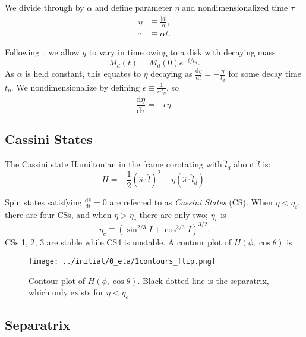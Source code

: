\documentclass[
        fleqn,
        usenatbib,
    ]{mnras}
\newcommand*{\rd}[2]{\frac{\mathrm{d}#1}{\mathrm{d}#2}}
\newcommand*{\abs}[1]{\left|#1\right|}
\newcommand*{\p}[1]{\left(#1\right)}
\begin{document}
We divide through by $\alpha$ and define parameter $\eta$ and nondimensionalized
time $\tau$
\begin{align}
    \eta &\equiv \frac{\abs{g}}{\alpha}\label{eq:eta},\\
    \tau &\equiv \alpha t.
\end{align}

Following~\cite{millholland_disk}, we allow $g$ to vary in time owing to a
disk with decaying mass
\begin{equation}
    M_d(t) = M_d(0)e^{-t/t_d}.
\end{equation}
As $\alpha$ is held constant, this equates to $\eta$ decaying as $\rd{\eta}{t} =
-\frac{\eta}{t_d}$ for some decay time $t_\eta$. We nondimensionalize by
defining $\epsilon \equiv \frac{1}{\alpha t_\eta}$, so
\begin{equation}
    \rd{\eta}{\tau} = -\epsilon \eta.
\end{equation}

\subsection{Cassini States}\label{ss:cs}

The Cassini state Hamiltonian in the frame corotating with $\hat{l}_d$ about
$\hat{l}$ is:
\begin{equation}
    H = -\frac{1}{2}\p{\hat{s} \cdot \hat{l}}^2
        + \eta \p{\hat{s} \cdot \hat{l}_d}.
\end{equation}

Spin states satisfying $\rd{\hat{s}}{t} = 0$ are referred to as \emph{Cassini
States} (CS). When $\eta < \eta_c$, there are four CSs, and when $\eta > \eta_c$
there are only two; $\eta_c$ is \citep{henrard1987,ward2004I}
\begin{equation}
    \eta_c \equiv \p{\sin^{2/3}I + \cos^{2/3}I}^{3/2}.
\end{equation}
CSs 1, 2, 3 are stable while CS4 is unstable. A contour plot of $H\p{\phi, \cos
\theta}$ is
\begin{figure}
    \centering
    \texttt{[image: ../initial/0\_eta/1contours\_flip.png]}
    \caption{Contour plot of $H\p{\phi, \cos \theta}$. Black dotted line is the
    separatrix, which only exists for $\eta < \eta_c$.}\label{fig:eq_1contours}
\end{figure}

\subsection{Separatrix}
\end{document}
